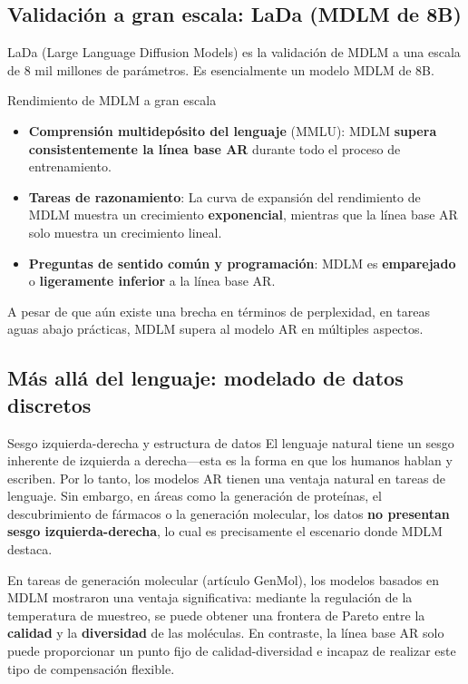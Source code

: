 \documentclass[a4paper]{article}
\begin{document}
\subsection{Validación a gran escala: LaDa (MDLM de 8B)}

LaDa (Large Language Diffusion Models) es la validación de MDLM a una escala de 8 mil millones de parámetros. Es esencialmente un modelo MDLM de 8B.

\begin{importantbox}{Rendimiento de MDLM a gran escala}
\begin{itemize}
    \item \textbf{Comprensión multidepósito del lenguaje} (MMLU): MDLM \textbf{supera consistentemente la línea base AR} durante todo el proceso de entrenamiento.
    \item \textbf{Tareas de razonamiento}: La curva de expansión del rendimiento de MDLM muestra un crecimiento \textbf{exponencial}, mientras que la línea base AR solo muestra un crecimiento lineal.
    \item \textbf{Preguntas de sentido común y programación}: MDLM es \textbf{emparejado} o \textbf{ligeramente inferior} a la línea base AR.
\end{itemize}
A pesar de que aún existe una brecha en términos de perplexidad, en tareas aguas abajo prácticas, MDLM supera al modelo AR en múltiples aspectos.
\end{importantbox}

\subsection{Más allá del lenguaje: modelado de datos discretos}

\begin{knowledgebox}{Sesgo izquierda-derecha y estructura de datos}
El lenguaje natural tiene un sesgo inherente de izquierda a derecha—esta es la forma en que los humanos hablan y escriben. Por lo tanto, los modelos AR tienen una ventaja natural en tareas de lenguaje. Sin embargo, en áreas como la generación de proteínas, el descubrimiento de fármacos o la generación molecular, los datos \textbf{no presentan sesgo izquierda-derecha}, lo cual es precisamente el escenario donde MDLM destaca.
\end{knowledgebox}

En tareas de generación molecular (artículo GenMol), los modelos basados en MDLM mostraron una ventaja significativa: mediante la regulación de la temperatura de muestreo, se puede obtener una frontera de Pareto entre la \textbf{calidad} y la \textbf{diversidad} de las moléculas. En contraste, la línea base AR solo puede proporcionar un punto fijo de calidad-diversidad e incapaz de realizar este tipo de compensación flexible.
\end{document}
